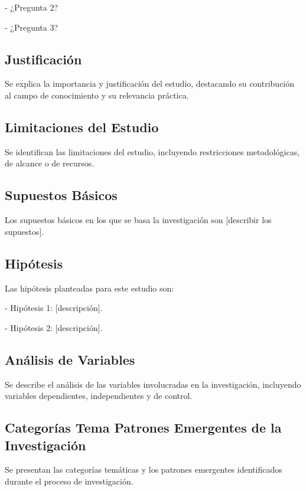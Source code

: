 - ¿Pregunta 2?

- ¿Pregunta 3?

\subsection{Justificación}

Se explica la importancia y justificación del estudio, destacando su contribución al campo de conocimiento y su relevancia práctica.

\subsection{Limitaciones del Estudio}

Se identifican las limitaciones del estudio, incluyendo restricciones metodológicas, de alcance o de recursos.

\subsection{Supuestos Básicos}

Los supuestos básicos en los que se basa la investigación son [describir los supuestos].

\subsection{Hipótesis}

Las hipótesis planteadas para este estudio son:

- Hipótesis 1: [descripción].

- Hipótesis 2: [descripción].

\subsection{Análisis de Variables}

Se describe el análisis de las variables involucradas en la investigación, incluyendo variables dependientes, independientes y de control.

\subsection{Categorías Tema Patrones Emergentes de la Investigación}

Se presentan las categorías temáticas y los patrones emergentes identificados durante el proceso de investigación.